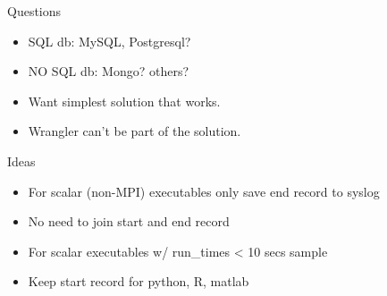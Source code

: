 \documentclass{beamer}
\begin{document}
\begin{frame}{Questions}
  \begin{itemize}
    \item SQL db: MySQL, Postgresql?
    \item NO SQL db: Mongo? others?
    \item Want simplest solution that works.
    \item Wrangler can't be part of the solution.
  \end{itemize}
\end{frame}

\begin{frame}{Ideas}
  \begin{itemize}
    \item For scalar (non-MPI) executables only save end record to
      syslog
    \item No need to join start and end record
    \item For scalar executables w/ run_times < 10 secs sample 
    \item Keep start record for python, R, matlab
  \end{itemize}
\end{frame}
\end{document}
